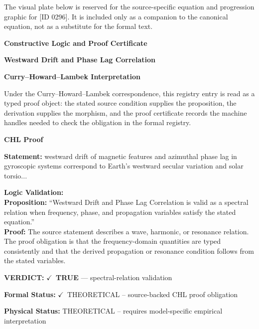 \begingroup\footnotesize\sloppy
The visual plate below is reserved for the source-specific equation and progression graphic for [ID 0296]. It is included only as a companion to the canonical equation, not as a substitute for the formal text.
\par\endgroup
\ifTZPDarkEdition
{}
\fi

\clearpage
\begingroup\tzpsupportsetup
\noindent\textbf{\fontsize{10.8pt}{12.8pt}\selectfont [ID 0296] Constructive Logic and Proof Certificate}\par
\noindent\textbf{\fontsize{10pt}{12pt}\selectfont Westward Drift and Phase Lag Correlation}\par
\vspace{0.45em}
\begingroup
\footnotesize
\setlength{\parskip}{0.22em}
\setlength{\parindent}{0pt}
\noindent\textbf{Curry--Howard--Lambek Interpretation}\par
Under the Curry--Howard--Lambek correspondence, this registry entry is read as a typed proof
object: the stated source condition supplies the proposition, the derivation supplies the
morphism, and the proof certificate records the machine handles needed to check the obligation
in the formal registry.

\vspace{0.45em}
\noindent\textbf{CHL Proof}\par
\textbf{Statement:} westward drift of magnetic features and azimuthal phase lag in gyroscopic systems
correspond to Earth's westward secular variation and solar torsio...

\textbf{Logic Validation:}\\
\textbf{Proposition:} ``Westward Drift and Phase Lag Correlation is valid as a spectral relation when frequency,
phase, and propagation variables satisfy the stated equation.''\\
\textbf{Proof:} The source statement describes a wave, harmonic, or resonance relation. The proof
obligation is that the frequency-domain quantities are typed consistently and that the
derived propagation or resonance condition follows from the stated variables.

\textbf{VERDICT:} \ensuremath{\checkmark}\ \textbf{TRUE} --- spectral-relation validation

\textbf{Formal Status:} \ensuremath{\checkmark}\ THEORETICAL -- source-backed CHL proof obligation

\textbf{Physical Status:} THEORETICAL -- requires model-specific empirical interpretation
\par\vspace{0.45em}
\par
\ifTZPDarkEdition
{}
\fi
\endgroup
\endgroup
